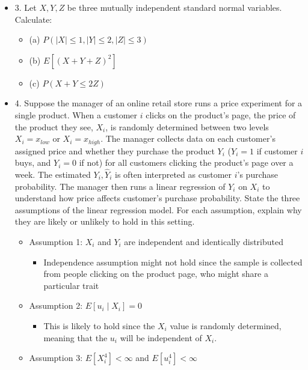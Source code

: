 \documentclass{article}
\begin{document}
\begin{itemize}
\begin{itemize}
\begin{itemize}
        \end{itemize}
    \end{itemize}
    \item 3. Let $X,Y,Z$ be three mutually independent standard normal variables. Calculate:
    \begin{itemize}
        \item (a) $P(\vert X \vert \le 1, \vert Y \vert \le 2, \vert Z \vert \le 3)$
        \item (b) $E[(X+Y+Z)^2]$
        \item (c) $P(X+Y \le 2Z)$
    \end{itemize}
    \item 4. Suppose the manager of an online retail store runs a price experiment for a single product. When a customer $i$ clicks on the product's page, the price of the product they see, $X_i$, is randomly determined between two levels $X_i = x_{low}$ or $X_i = x_{high}$. The manager collects data on each customer's assigned price and whether they purchase the product $Y_i$ ($Y_i=1$ if customer $i$ buys, and $Y_i=0$ if not) for all customers clicking the product's page over a week. The estimated $Y_i, \hat{Y}_i$ is often interpreted as customer $i$'s purchase probability. The manager then runs a linear regression of $Y_i$ on $X_i$ to understand how price affects customer's purchase probability. State the three assumptions of the linear regression model. For each assumption, explain why they are likely or unlikely to hold in this setting.
    \begin{itemize}
        \item Assumption 1: $X_i$ and $Y_i$ are independent and identically distributed
        \begin{itemize}
            \item Independence assumption might not hold since the sample is collected from people clicking on the product page, who might share a particular trait
        \end{itemize}
        \item Assumption 2: $E[u_i \mid X_i] = 0$
        \begin{itemize}
            \item This is likely to hold since the $X_i$ value is randomly determined, meaning that the $u_i$ will be independent of $X_i$.
        \end{itemize}
        \item Assumption 3: $E[X_i^4] < \infty$ and $E[u_i^4] < \infty$
        \begin{itemize}

\end{itemize}
\end{itemize}
\end{itemize}
\end{document}
